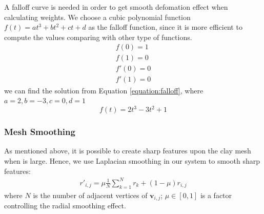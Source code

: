 A falloff curve is needed in order to get smooth defomation effect when calculating weights. We choose a cubic polynomial function $f(t) = at^3 + bt^2 + ct + d$ as the falloff function, since it is more efficient to compute the values comparing with other type of functions.
\begin{equation}
\begin{aligned}
\label{equation:falloff}
f(0) = 1 \\
f(1) = 0 \\ 
f'(0) = 0 \\
f'(1) = 0
\end{aligned}
\end{equation}
we can find the solution from Equation \ref{equation:falloff}, where 
$a = 2, b = -3, c = 0, d = 1$
\begin{equation}
f(t) = 2t^3 - 3t^2 + 1
\end{equation}


\subsubsection{Mesh Smoothing}
\label{sec:4.2.4}
As mentioned above, it is possible to create sharp features upon the clay mesh when  is large. Hence, we use Laplacian smoothing in our system to smooth sharp features: 
\begin{equation}
\begin{split}
r'_{i,j} = 
\mu  \frac{1}{N} 
\sum_{k=1}^N r_{k}
+ (1 - \mu)  r_{i,j}
\end{split}
\end{equation}
where $N$ is the number of adjacent vertices of $\mathbf{v}_{i,j}$; $\mu \in [0,1]$ is a factor controlling the radial smoothing effect.

